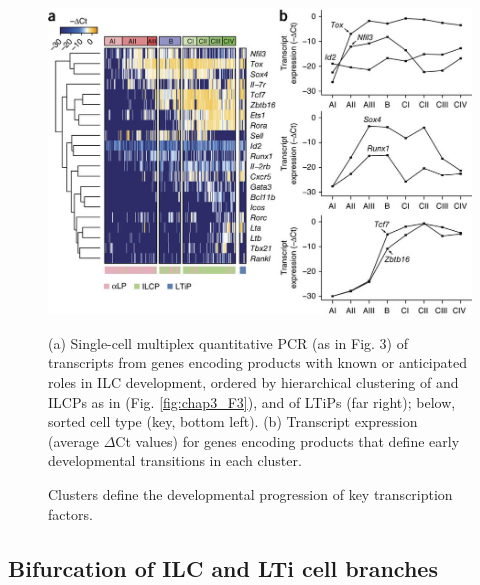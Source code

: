 \begin{figure}[h]
\begin{center}
	\includegraphics[width=\textwidth]{figures/chapter3/F4}
\end{center}
	\caption{Clusters define the developmental progression of key transcription factors.} 
	(a) Single-cell multiplex quantitative PCR (as in Fig. 3) of transcripts from genes encoding products with known or anticipated roles in ILC development, ordered by hierarchical clustering of \aLPs and ILCPs as in (Fig. \ref{fig:chap3_F3}), and of LTiPs (far right); below, sorted cell type (key, bottom left). (b) Transcript expression (average $\Delta$Ct values) for genes encoding products that define early developmental transitions in each cluster.
	\label{fig:chap3_F4}
\end{figure}

\subsection{Bifurcation of ILC and LTi cell branches}

